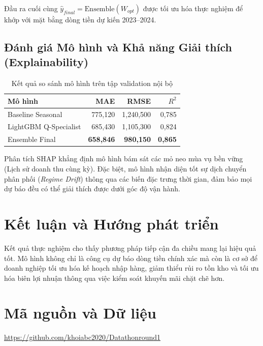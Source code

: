 \documentclass{article}
\begin{document}
Đầu ra cuối cùng $\hat{y}_{final} = \text{Ensemble}(W_{opt})$ được tối ưu hóa thực nghiệm để khớp với mặt bằng dòng tiền dự kiến 2023--2024.

\subsection{Đánh giá Mô hình và Khả năng Giải thích (Explainability)}

\begin{table}[htbp]
  \centering
  \small
  \caption{Kết quả so sánh mô hình trên tập validation nội bộ}
  \vspace{-5pt}
  \label{tab:model_results}
  \begin{tabular}{lrrr}
    \toprule
    \textbf{Mô hình} & \textbf{MAE} & \textbf{RMSE} & \textbf{$R^2$} \\
    \midrule
    Baseline Seasonal & 775{,}120 & 1{,}240{,}500 & 0{,}785 \\
    LightGBM Q-Specialist & 685{,}430 & 1{,}105{,}300 & 0{,}824 \\
    Ensemble Final & \textbf{658{,}846} & \textbf{980{,}150} & \textbf{0{,}865} \\
    \bottomrule
  \end{tabular}
\end{table}

Phân tích SHAP khẳng định mô hình bám sát các mỏ neo mùa vụ bền vững (Lịch sử doanh thu cùng kỳ). Đặc biệt, mô hình nhận diện tốt sự dịch chuyển phân phối (\textit{Regime Drift}) thông qua các biến đặc trưng thời gian, đảm bảo mọi dự báo đều có thể giải thích được dưới góc độ vận hành.

\section{Kết luận và Hướng phát triển}

Kết quả thực nghiệm cho thấy phương pháp tiếp cận đa chiều mang lại hiệu quả tốt. Mô hình không chỉ là công cụ dự báo dòng tiền chính xác mà còn là cơ sở để doanh nghiệp tối ưu hóa kế hoạch nhập hàng, giảm thiểu rủi ro tồn kho và tối ưu hóa biên lợi nhuận thông qua việc kiểm soát khuyến mãi chặt chẽ hơn.

\section{Mã nguồn và Dữ liệu}
\vspace{-5pt}
\begin{center}
  \small \url{https://github.com/khoiabc2020/Datathonround1}
\end{center}
\vspace{-5pt}
\end{document}
